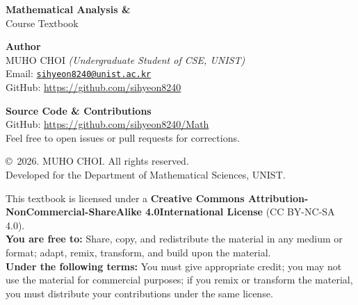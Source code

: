 \documentclass[11pt, a4paper, oneside]{book}
\begin{document}
\begin{flushleft}
    \vfill

    {\large \textbf{Mathematical Analysis  \& }}
    \\[0.2cm]
    {\small Course Textbook} \\
    
    \vspace{2cm}
    
    \textbf{Author} \\
    MUHO CHOI \emph{(Undergraduate Student of CSE, UNIST)} \\
    Email: \href{mailto:sihyeon8240@unist.ac.kr}{\texttt{sihyeon8240@unist.ac.kr}} \\
    GitHub: \url{https://github.com/sihyeon8240} \\
    
    \vspace{1cm}
    
    \textbf{Source Code \& Contributions} \\
    GitHub: \url{https://github.com/sihyeon8240/Math} \\
    \footnotesize{Feel free to open issues or pull requests for corrections.}
    
    \vspace{1cm}
    
    \copyright\ 2026. MUHO CHOI. All rights reserved. \\
    \small{Developed for the Department of Mathematical Sciences, UNIST.} \\

    \vspace{0.4cm}
    
    \footnotesize{
        This textbook is licensed under a
        \textbf{Creative Commons Attribution-NonCommercial-ShareAlike 4.0International License} (CC BY-NC-SA 4.0). \\
        \vspace{0.1cm}
        \textbf{You are free to:} Share, copy, and redistribute the material in any medium or format;
        adapt, remix, transform, and build upon the material. \\
        \textbf{Under the following terms:} You must give appropriate credit;
        you may not use the material for commercial purposes;
        if you remix or transform the material, you must distribute your contributions under the same license.
    }
\end{flushleft}

\tableofcontents
\end{document}
